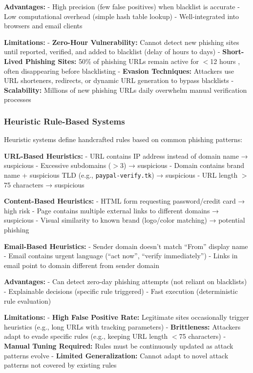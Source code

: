 \textbf{Advantages:} - High precision (few false positives) when
blacklist is accurate - Low computational overhead (simple hash table
lookup) - Well-integrated into browsers and email clients

\textbf{Limitations:} - \textbf{Zero-Hour Vulnerability:} Cannot detect
new phishing sites until reported, verified, and added to blacklist
(delay of hours to days) - \textbf{Short-Lived Phishing Sites:} 50\% of
phishing URLs remain active for $<$12 hours \cite{ramesh2015_ch4}, often
disappearing before blacklisting - \textbf{Evasion Techniques:}
Attackers use URL shorteners, redirects, or dynamic URL generation to
bypass blacklists - \textbf{Scalability:} Millions of new phishing URLs
daily overwhelm manual verification processes

\subsubsection{Heuristic Rule-Based
Systems}\label{heuristic-rule-based-systems}

Heuristic systems define handcrafted rules based on common phishing
patterns:

\textbf{URL-Based Heuristics:} - URL contains IP address instead of
domain name → suspicious - Excessive subdomains ($>$3) →
suspicious - Domain contains brand name + suspicious TLD (e.g.,
\texttt{paypal-verify.tk}) → suspicious - URL length $>$75
characters → suspicious

\textbf{Content-Based Heuristics:} - HTML form requesting
password/credit card → high risk - Page contains multiple external links
to different domains → suspicious - Visual similarity to known brand
(logo/color matching) → potential phishing

\textbf{Email-Based Heuristics:} - Sender domain doesn't match ``From''
display name - Email contains urgent language (``act now'', ``verify
immediately'') - Links in email point to domain different from sender
domain

\textbf{Advantages:} - Can detect zero-day phishing attempts (not
reliant on blacklists) - Explainable decisions (specific rule triggered)
- Fast execution (deterministic rule evaluation)

\textbf{Limitations:} - \textbf{High False Positive Rate:} Legitimate
sites occasionally trigger heuristics (e.g., long URLs with tracking
parameters) - \textbf{Brittleness:} Attackers adapt to evade specific
rules (e.g., keeping URL length $<$75 characters) - \textbf{Manual
Tuning Required:} Rules must be continuously updated as attack patterns
evolve - \textbf{Limited Generalization:} Cannot adapt to novel attack
patterns not covered by existing rules

